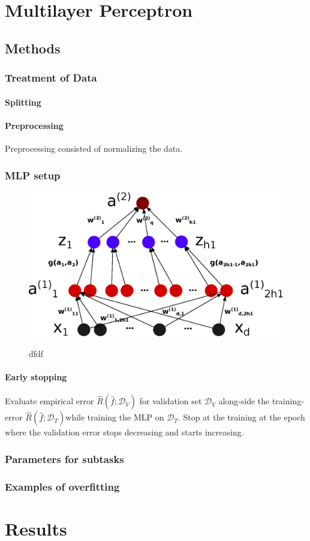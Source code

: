 \section{Multilayer Perceptron}

\subsection{Methods}

\subsubsection{Treatment of Data}

\paragraph{Splitting}

\paragraph{Preprocessing}
Preprocessing consisted of normalizing the data.

\subsubsection{MLP setup}

\begin{figure}
	\centering
	\includegraphics[width=.8\textwidth]{mlp/mlp.eps}
	\label{mlp}
	\caption{dfdf}
\end{figure}

\paragraph{Early stopping}
Evaluate empirical error $\hat{R}(\hat{f};\mathcal{D}_V)$ for validation set $\mathcal{D}_V$ along-side the training-error $\hat{R}(\hat{f};\mathcal{D}_T)$while training the MLP on $\mathcal{D}_T$. Stop at the training at the epoch where the validation error stops decreasing and starts increasing. 
\subsubsection{Parameters for subtasks}

\subsubsection{Examples of overfitting}

\section{Results}